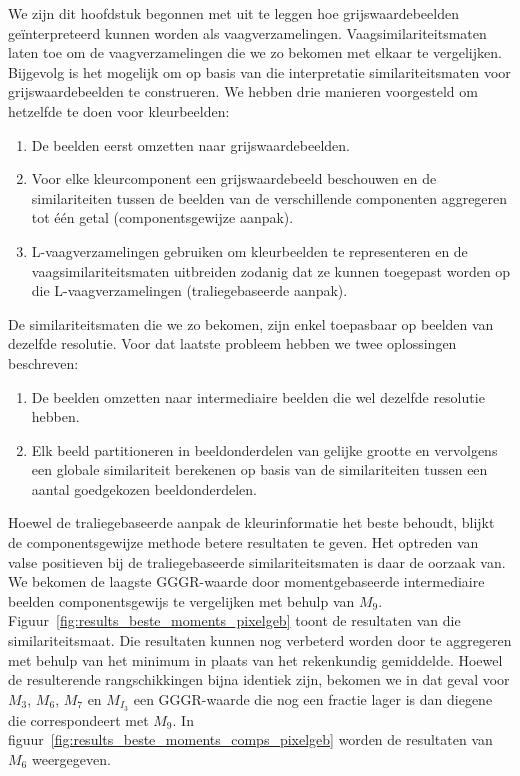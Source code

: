 We zijn dit hoofdstuk begonnen met uit te leggen hoe grijswaardebeelden 
ge\"interpreteerd kunnen worden als vaagverzamelingen. Vaagsimilariteitsmaten 
laten toe om de vaagverzamelingen die we zo bekomen met elkaar te vergelijken.
Bijgevolg is het mogelijk om op basis van die interpretatie similariteitsmaten voor 
grijswaardebeelden te construeren. We hebben drie manieren voorgesteld om hetzelfde te 
doen voor kleurbeelden:
\begin{enumerate}
  \item De beelden eerst omzetten naar grijswaardebeelden.
  \item Voor elke kleurcomponent een grijswaardebeeld beschouwen en de similariteiten
  tussen de beelden van de verschillende componenten aggregeren tot \'e\'en getal
  (componentsgewijze aanpak).
  \item L-vaagverzamelingen gebruiken om kleurbeelden te representeren en de
  vaagsimilariteitsmaten uitbreiden zodanig dat ze kunnen toegepast worden
  op die L-vaagverza\-me\-ling\-en (traliegebaseerde aanpak).
\end{enumerate}
De similariteitsmaten die we zo bekomen, zijn enkel toepasbaar op beelden van dezelfde
resolutie. Voor dat laatste probleem hebben we twee oplossingen beschreven:
\begin{enumerate}
  \item De beelden omzetten naar intermediaire beelden die wel dezelfde resolutie
  hebben.
  \item Elk beeld partitioneren in beeldonderdelen van gelijke grootte en vervolgens
  een globale similariteit berekenen op basis van de similariteiten tussen een aantal
  goedgekozen beeldonderdelen.
\end{enumerate}

Hoewel de traliegebaseerde aanpak de kleurinformatie het beste behoudt, blijkt de 
componentsgewijze methode betere resultaten te geven. Het optreden van valse positieven 
bij de traliegebaseerde similariteitsmaten is daar de oorzaak van. We bekomen de laagste
GGGR-waarde door momentgebaseerde intermediaire beelden componentsgewijs te vergelijken
met behulp van $M_9$. Figuur~\ref{fig:results_beste_moments_pixelgeb} 
toont de resultaten van die similariteitsmaat. Die resultaten kunnen nog verbeterd worden 
door te aggregeren met behulp van het minimum in plaats van het rekenkundig gemiddelde. Hoewel de 
resulterende rangschikkingen bijna identiek zijn, bekomen we in dat geval voor $M_3$, $M_6$, 
$M_7$ en $M_{I_3}$ een GGGR-waarde die nog een fractie lager is dan diegene die correspondeert
met $M_9$. In figuur~\ref{fig:results_beste_moments_comps_pixelgeb} worden de resultaten
van $M_6$ weergegeven.

